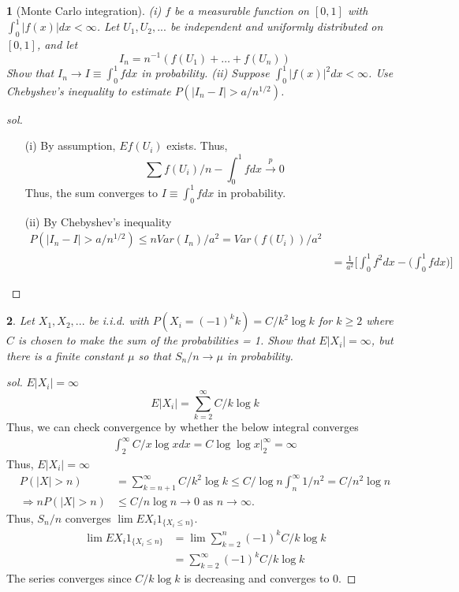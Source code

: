 \documentclass{report}
\newtheorem{ex}{}[section]
\begin{document}
\begin{ex}[Monte Carlo integration]
(i) $f$ be a measurable function on $[0,1]$ with $\int_0^1 |f(x)|dx < \infty$. Let $U_1, U_2,...$ be independent and uniformly distributed on $[0,1]$, and let
\[I_n = n^{-1}(f(U_1)+\dotsc+f(U_n))\]
Show that $I_n \to I \equiv \int_0^1 f dx$ in probability. (ii) Suppose $\int_0^1 |f(x)|^2dx < \infty$. Use Chebyshev's inequality to estimate $P(|I_n - I| > a/n^{1/2})$.
\end{ex}
\begin{proof}[sol]~
\begin{enumerate}
    \item[(i)] By assumption, $Ef(U_i)$ exists. Thus, 
    \[\sum f(U_i)/n - \int_0^1 fdx \overset{p}{\to} 0 \]
    Thus, the sum converges to $I \equiv \int_0^1 fdx$ in probability.
    \item[(ii)] By Chebyshev's inequality
    \begin{align*}
        P(|I_n - I| > a/n^{1/2}) \le nVar(I_n)/a^2 = Var(f(U_i))/a^2\\
        &= \frac{1}{a^2}\bigg[\int_0^1 f^2dx - \bigg(\int_0^1 fdx\bigg)\bigg]
    \end{align*}
\end{enumerate}
\end{proof}
\begin{ex}
Let $X_1, X_2,...$ be i.i.d. with $P(X_i = (-1)^k k) = C/k^2\log k$ for $k \ge 2$ where $C$ is chosen to make the sum of the probabilities = 1. Show that $E|X_i| = \infty$, but there is a finite constant $\mu$ so that $S_n/n \to \mu$ in probability.
\end{ex}
\begin{proof}[sol]
$E|X_i| = \infty$
\[E|X_i| = \sum^\infty_{k=2} C/k\log k\]
Thus, we can check convergence by whether the below integral converges
\begin{align*}
    \int_2^\infty C/x\log xdx = C\log\log x|_2^\infty = \infty
\end{align*}
Thus, $E|X_i| = \infty$
\begin{align*}
    P(|X| > n) &= \sum_{k = n + 1}^\infty  C/k^2\log k \le C/\log n\int_n^\infty 1/n^2 = C/n^2\log n\\
     \Rightarrow nP(|X| > n) &\le  C/n\log n \to 0 \text{ as } n \to \infty. 
\end{align*}
Thus, $S_n / n$ converges $\lim EX_i 1_{\{X_i \le n\}}$.
\begin{align*}
    \lim EX_i 1_{\{X_i \le n\}} &= \lim \sum^n_{k=2} (-1)^k C/k\log k\\
    &= \sum^\infty_{k=2} (-1)^k C/k\log k
\end{align*}
The series converges since $C/k\log k$ is decreasing and converges to 0.
\end{proof}
\end{document}
